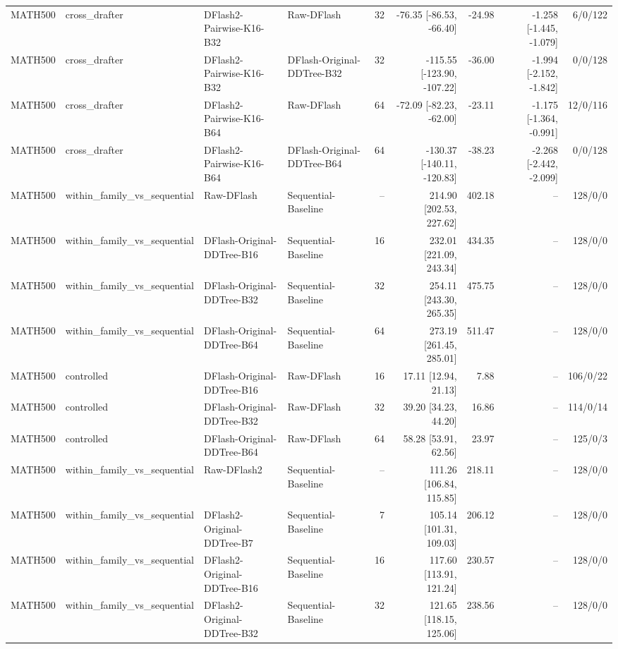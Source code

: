 \begin{longtable}{llllrrrrr}
MATH500 & cross\_drafter & DFlash2-Pairwise-K16-B32 & Raw-DFlash & 32 & -76.35 [-86.53, -66.40] & -24.98 & -1.258 [-1.445, -1.079] & 6/0/122 \\
MATH500 & cross\_drafter & DFlash2-Pairwise-K16-B32 & DFlash-Original-DDTree-B32 & 32 & -115.55 [-123.90, -107.22] & -36.00 & -1.994 [-2.152, -1.842] & 0/0/128 \\
MATH500 & cross\_drafter & DFlash2-Pairwise-K16-B64 & Raw-DFlash & 64 & -72.09 [-82.23, -62.00] & -23.11 & -1.175 [-1.364, -0.991] & 12/0/116 \\
MATH500 & cross\_drafter & DFlash2-Pairwise-K16-B64 & DFlash-Original-DDTree-B64 & 64 & -130.37 [-140.11, -120.83] & -38.23 & -2.268 [-2.442, -2.099] & 0/0/128 \\
MATH500 & within\_family\_vs\_sequential & Raw-DFlash & Sequential-Baseline & -- & 214.90 [202.53, 227.62] & 402.18 & -- & 128/0/0 \\
MATH500 & within\_family\_vs\_sequential & DFlash-Original-DDTree-B16 & Sequential-Baseline & 16 & 232.01 [221.09, 243.34] & 434.35 & -- & 128/0/0 \\
MATH500 & within\_family\_vs\_sequential & DFlash-Original-DDTree-B32 & Sequential-Baseline & 32 & 254.11 [243.30, 265.35] & 475.75 & -- & 128/0/0 \\
MATH500 & within\_family\_vs\_sequential & DFlash-Original-DDTree-B64 & Sequential-Baseline & 64 & 273.19 [261.45, 285.01] & 511.47 & -- & 128/0/0 \\
MATH500 & controlled & DFlash-Original-DDTree-B16 & Raw-DFlash & 16 & 17.11 [12.94, 21.13] & 7.88 & -- & 106/0/22 \\
MATH500 & controlled & DFlash-Original-DDTree-B32 & Raw-DFlash & 32 & 39.20 [34.23, 44.20] & 16.86 & -- & 114/0/14 \\
MATH500 & controlled & DFlash-Original-DDTree-B64 & Raw-DFlash & 64 & 58.28 [53.91, 62.56] & 23.97 & -- & 125/0/3 \\
MATH500 & within\_family\_vs\_sequential & Raw-DFlash2 & Sequential-Baseline & -- & 111.26 [106.84, 115.85] & 218.11 & -- & 128/0/0 \\
MATH500 & within\_family\_vs\_sequential & DFlash2-Original-DDTree-B7 & Sequential-Baseline & 7 & 105.14 [101.31, 109.03] & 206.12 & -- & 128/0/0 \\
MATH500 & within\_family\_vs\_sequential & DFlash2-Original-DDTree-B16 & Sequential-Baseline & 16 & 117.60 [113.91, 121.24] & 230.57 & -- & 128/0/0 \\
MATH500 & within\_family\_vs\_sequential & DFlash2-Original-DDTree-B32 & Sequential-Baseline & 32 & 121.65 [118.15, 125.06] & 238.56 & -- & 128/0/0 \\

\end{longtable}
